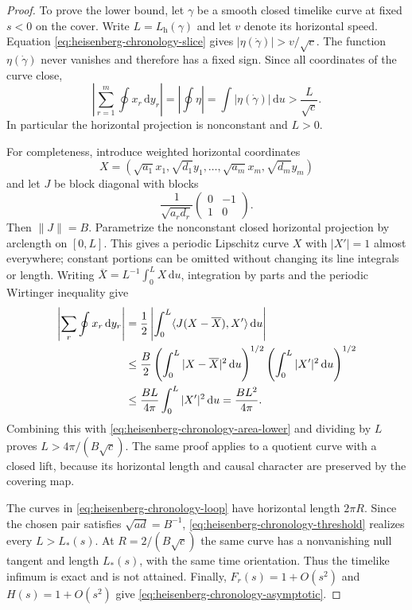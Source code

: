 \documentclass[10pt,a4paper]{article}
\numberwithin{equation}{section}
\theoremstyle{definition}
\theoremstyle{remark}
\newcommand{\dd}{\mathrm d}
\begin{document}
\begin{proof}
To prove the lower bound, let $\gamma$ be a smooth closed timelike
curve at fixed $s<0$ on the cover.  Write $L=L_{\mathrm h}(\gamma)$
and let $v$ denote its horizontal speed.  Equation
\eqref{eq:heisenberg-chronology-slice} gives
$|\eta(\dot\gamma)|>v/\sqrt c$.  The function
$\eta(\dot\gamma)$ never vanishes and therefore has a fixed sign.
Since all coordinates of the curve close,
\begin{equation}
 \left|\sum_{r=1}^m\oint x_r\,\dd y_r\right|
 =\left|\oint\eta\right|
 =\int|\eta(\dot\gamma)|\,\dd u
 >\frac L{\sqrt c}.
 \label{eq:heisenberg-chronology-area-lower}
\end{equation}
In particular the horizontal projection is nonconstant and $L>0$.

For completeness, introduce weighted horizontal coordinates
\[
 X=(\sqrt{a_1}x_1,\sqrt{d_1}y_1,\ldots,
             \sqrt{a_m}x_m,\sqrt{d_m}y_m)
\]
and let $J$ be block diagonal with blocks
\[
 \frac1{\sqrt{a_rd_r}}
 \begin{pmatrix}0&-1\\1&0\end{pmatrix}.
\]
Then $\|J\|=B$.  Parametrize the nonconstant closed horizontal
projection by arclength on $[0,L]$.  This gives a periodic Lipschitz
curve $X$ with $|X'|=1$ almost everywhere; constant portions can
be omitted without changing its line integrals or length.
Writing $\overline X=L^{-1}\int_0^L X\,\dd u$, integration by
parts and the periodic Wirtinger inequality give
\begin{align}
 \left|\sum_r\oint x_r\,\dd y_r\right|
 &=\frac12\left|\int_0^L
           \langle J(X-\overline X),X'\rangle\,\dd u\right|
       \notag\\
 &\le\frac B2
       \left(\int_0^L|X-\overline X|^2\,\dd u\right)^{1/2}
       \left(\int_0^L|X'|^2\,\dd u\right)^{1/2}
       \notag\\
 &\le\frac{BL}{4\pi}\int_0^L|X'|^2\,\dd u
 =\frac{BL^2}{4\pi}.
 \label{eq:heisenberg-chronology-isoperimetry}
\end{align}
Combining this with
\eqref{eq:heisenberg-chronology-area-lower} and dividing by $L$
proves $L>4\pi/(B\sqrt c)$.
The same proof applies to a quotient curve with a closed lift,
because its horizontal length and causal character are preserved
by the covering map.

The curves in \eqref{eq:heisenberg-chronology-loop} have horizontal
length $2\pi R$.  Since the chosen pair satisfies
$\sqrt{ad}=B^{-1}$,
\eqref{eq:heisenberg-chronology-threshold} realizes every
$L>L_*(s)$.  At $R=2/(B\sqrt c)$ the same curve has a
nonvanishing null tangent and length $L_*(s)$, with the same time
orientation.  Thus the timelike infimum is exact and is not
attained.  Finally, $F_r(s)=1+O(s^2)$ and $H(s)=1+O(s^2)$
give \eqref{eq:heisenberg-chronology-asymptotic}.
\end{proof}
\end{document}
